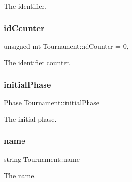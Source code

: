 The identifier. 

\hypertarget{class_tournament_a02145894ee5d8aedffa86b6444cf4205}{}\label{class_tournament_a02145894ee5d8aedffa86b6444cf4205} 
\subsubsection{\texorpdfstring{id\+Counter}{idCounter}}
{\footnotesize\ttfamily unsigned int Tournament\+::id\+Counter = 0\hspace{0.3cm}{\ttfamily [static]}, {\ttfamily [private]}}



The identifier counter. 

\hypertarget{class_tournament_a1536d0ea138cb8ccd6ce0ef5e2d0f6ec}{}\label{class_tournament_a1536d0ea138cb8ccd6ce0ef5e2d0f6ec} 
\subsubsection{\texorpdfstring{initial\+Phase}{initialPhase}}
{\footnotesize\ttfamily \hyperlink{_tournament_8hpp_ae1c5184dc404edf057ed537bcfddef84}{Phase} Tournament\+::initial\+Phase\hspace{0.3cm}{\ttfamily [private]}}



The initial phase. 

\hypertarget{class_tournament_a6d4f678a73d89147d34bb1d0c50cc976}{}\label{class_tournament_a6d4f678a73d89147d34bb1d0c50cc976} 
\subsubsection{\texorpdfstring{name}{name}}
{\footnotesize\ttfamily string Tournament\+::name\hspace{0.3cm}{\ttfamily [private]}}



The name. 

\hypertarget{class_tournament_a3b41df083ed5b33411e307ad1859ab6d}{}\label{class_tournament_a3b41df083ed5b33411e307ad1859ab6d} 
